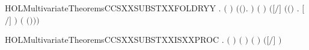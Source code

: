 \newcommand{\HOLMultivariateTheoremsCCSXXSUBSTXXFOLDR}{\UseVerbatim{HOLMultivariateTheoremsCCSXXSUBSTXXFOLDR}}
\begin{SaveVerbatim}{HOLMultivariateTheoremsCCSXXSUBSTXXFOLDRYY}
\HOLTokenTurnstile{} \HOLSymConst{\HOLTokenForall{}}  .
         \HOLSymConst{\HOLTokenConj{}} \ensuremath{(}  \HOLSymConst{\ensuremath{=}}  \ensuremath{)} \HOLSymConst{\HOLTokenConj{}}
        \ensuremath{(}\HOLTokenLambda{}\ensuremath{(}\HOLSymConst{,}\ensuremath{)}.   \HOLConst{\HOLTokenSubset{}} \HOLTokenLeftbrace{}\HOLTokenRightbrace{}\ensuremath{)} \ensuremath{(}  \ensuremath{)} \HOLSymConst{\HOLTokenImp{}}
       \ensuremath{(}\ensuremath{[}\ensuremath{/}\ensuremath{]}  \HOLSymConst{\ensuremath{=}}  \ensuremath{(}\HOLTokenLambda{}\ensuremath{(}\HOLSymConst{,}\ensuremath{)} . \ensuremath{[}\ensuremath{/}\ensuremath{]} \ensuremath{)}  \ensuremath{(} \ensuremath{(}\HOLSymConst{,}\ensuremath{)}\ensuremath{)}\ensuremath{)}
\end{SaveVerbatim}
\newcommand{\HOLMultivariateTheoremsCCSXXSUBSTXXFOLDRYY}{\UseVerbatim{HOLMultivariateTheoremsCCSXXSUBSTXXFOLDRYY}}
\begin{SaveVerbatim}{HOLMultivariateTheoremsCCSXXSUBSTXXISXXPROC}
\HOLTokenTurnstile{} \HOLSymConst{\HOLTokenForall{}}  .
         \HOLSymConst{\HOLTokenConj{}} \ensuremath{(}  \HOLSymConst{\ensuremath{=}}  \ensuremath{)} \HOLSymConst{\HOLTokenConj{}}   \HOLSymConst{\HOLTokenConj{}}
         \HOLConst{\HOLTokenSubset{}}   \HOLSymConst{\HOLTokenConj{}}  \ensuremath{(} \ensuremath{)} \ensuremath{(} \ensuremath{)} \HOLSymConst{\HOLTokenImp{}}
        \ensuremath{(}\ensuremath{[}\ensuremath{/}\ensuremath{]} \ensuremath{)}
\end{SaveVerbatim}
